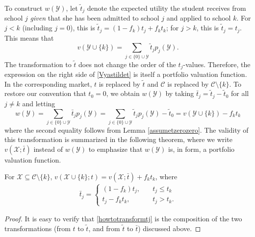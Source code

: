 To construct $w(\mathcal{Y})$, let $\tilde t_j$ denote the expected utility the student receives from school $j$ \emph{given} that she has been admitted to school $j$ and applied to school $k$. For $j < k$ (including $j = 0$), this is $\tilde t_j = (1- f_k) t_j + f_k t_k$; for $j > k $, this is $\tilde t_j = t_j$. This means that 
\begin{equation}\label{Vyastildet}
v(\mathcal{Y}\cup\{k\}) = \sum_{j \in \{0\} \cup \mathcal{Y}} \tilde t_j p_j(\mathcal{Y}).\end{equation}
The transformation to $\tilde t$ does not change the order of the $t_j$-values. Therefore, the expression on the right side of \eqref{Vyastildet} is itself a portfolio valuation function. In the corresponding market, $t$ is replaced by $\tilde t$ and $\mathcal{C}$ is replaced by $\mathcal{C}\setminus\{k\}$. To restore our convention that $t_0 = 0$, we obtain $w(\mathcal{Y})$ by taking $\bar t_j = \tilde t_j - \tilde t_0$ for all $j \neq k$ and letting
\begin{equation*} 
w(\mathcal{Y})
= \sum_{j \in \{0\} \cup \mathcal{Y}} \bar t_j p_j(\mathcal{Y})
= \sum_{j \in \{0\} \cup \mathcal{Y}} \tilde t_j p_j(\mathcal{Y})- \tilde t_0
= v(\mathcal{Y}\cup\{k\}) - f_k t_k
\end{equation*}
where the second equality follows from Lemma \ref{assumetzerozero}. The validity of this transformation is summarized in the following theorem, where we write $v(\mathcal{X}; \bar t)$ instead of $w(\mathcal{Y})$ to emphasize that $w(\mathcal{Y})$ is, in form, a portfolio valuation function. 


\begin{lemma} \label{eliminationtheorem}
For $\mathcal{X} \subseteq \mathcal{C} \setminus \{k\}$, $v(\mathcal{X}\cup\{k\}; t)  = v(\mathcal{X}; \bar t) + f_k t_k$, where
\begin{align}\label{howtotransformtj}
\bar t_j = 
\begin{cases}
(1 - f_k) t_j, \quad & t_j \leq t_k \\
t_j - f_k t_k, \quad& t_j > t_k.
\end{cases}
\end{align}
\end{lemma}

\begin{proof}
It is easy to verify that \eqref{howtotransformtj} is the composition of the two transformations (from $t$ to $\tilde t$, and from $\tilde t$ to $\bar t$) discussed above.
\end{proof}

